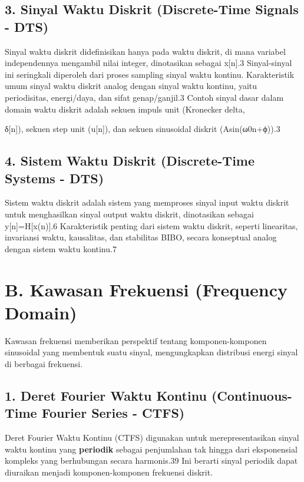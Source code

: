 \documentclass[
  letterpaper,
  DIV=11,
  numbers=noendperiod]{scrreprt}
\begin{document}
\subsection{3. Sinyal Waktu Diskrit (Discrete-Time Signals -
DTS)}\label{sinyal-waktu-diskrit-discrete-time-signals---dts}

Sinyal waktu diskrit didefinisikan hanya pada waktu diskrit, di mana
variabel independennya mengambil nilai integer, dinotasikan sebagai
x{[}n{]}.3 Sinyal-sinyal ini seringkali diperoleh dari proses sampling
sinyal waktu kontinu. Karakteristik umum sinyal waktu diskrit analog
dengan sinyal waktu kontinu, yaitu periodisitas, energi/daya, dan sifat
genap/ganjil.3 Contoh sinyal dasar dalam domain waktu diskrit adalah
sekuen impuls unit (Kronecker delta,

δ{[}n{]}), sekuen step unit (u{[}n{]}), dan sekuen sinusoidal diskrit
(Asin(ω0\hspace{0pt}n+ϕ)).3

\subsection{4. Sistem Waktu Diskrit (Discrete-Time Systems -
DTS)}\label{sistem-waktu-diskrit-discrete-time-systems---dts}

Sistem waktu diskrit adalah sistem yang memproses sinyal input waktu
diskrit untuk menghasilkan sinyal output waktu diskrit, dinotasikan
sebagai y{[}n{]}=H{[}x(n){]}.6 Karakteristik penting dari sistem waktu
diskrit, seperti linearitas, invariansi waktu, kausalitas, dan
stabilitas BIBO, secara konseptual analog dengan sistem waktu kontinu.7

\section{B. Kawasan Frekuensi (Frequency
Domain)}\label{b.-kawasan-frekuensi-frequency-domain}

Kawasan frekuensi memberikan perspektif tentang komponen-komponen
sinusoidal yang membentuk suatu sinyal, mengungkapkan distribusi energi
sinyal di berbagai frekuensi.

\subsection{1. Deret Fourier Waktu Kontinu (Continuous-Time Fourier
Series -
CTFS)}\label{deret-fourier-waktu-kontinu-continuous-time-fourier-series---ctfs}

Deret Fourier Waktu Kontinu (CTFS) digunakan untuk merepresentasikan
sinyal waktu kontinu yang \textbf{periodik} sebagai penjumlahan tak
hingga dari eksponensial kompleks yang berhubungan secara harmonis.39
Ini berarti sinyal periodik dapat diuraikan menjadi komponen-komponen
frekuensi diskrit.
\end{document}
